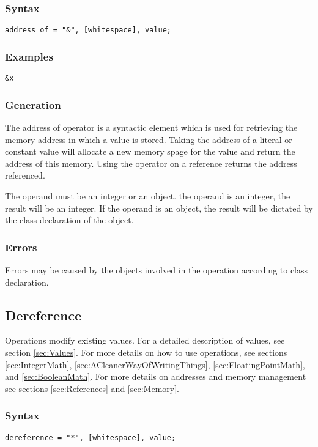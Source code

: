 \documentclass[10pt,a4paper]{article}
\begin{document}
\subsubsection{Syntax}
\begin{verbatim}
address of = "&", [whitespace], value;
\end{verbatim}

\subsubsection{Examples}
\begin{verbatim}
&x
\end{verbatim}

\subsubsection{Generation}
The address of operator is a syntactic element which is used for retrieving the memory address in which a value is stored. Taking the address of a literal or constant value will allocate a new memory spage for the value and return the address of this memory. Using the operator on a reference returns the address referenced. 

The operand must be an integer or an object. the operand is an integer, the result will be an integer. If the operand is an object, the result will be dictated by the class declaration of the object.

\subsubsection{Errors}
Errors may be caused by the objects involved in the operation according to class declaration. 

\newpage




\subsection{Dereference}
Operations modify existing values. For a detailed description of values, see section \ref{sec:Values}. For more details on how to use operations, see sections \ref{sec:IntegerMath}, \ref{sec:ACleanerWayOfWritingThings}, \ref{sec:FloatingPointMath}, and \ref{sec:BooleanMath}. For more details on addresses and memory management see sections \ref{sec:References} and \ref{sec:Memory}.

\subsubsection{Syntax}
\begin{verbatim}
dereference = "*", [whitespace], value;
\end{verbatim}
\end{document}
